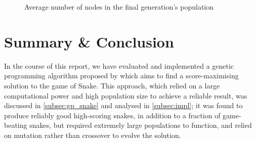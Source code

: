 \documentclass[british,10pt,a4paper]{article}
\begin{document}
\begin{figure}
  \vspace{-50pt}
  \begin{center}
	  \vspace{-5pt}
		\caption{Average number of nodes in the final generation's population}
		\label{fig:box_plot_algorithm_size}
	  \vspace{-10pt}
	  \end{center}
\end{figure}
\section{Summary \& Conclusion}
In the course of this report, we have evaluated and implemented a genetic programming algorithm proposed by \citet{Ehlis2000-sz} which aims to find a score-maximising solution to the game of Snake. This approach, which relied on a large computational power and high population size to achieve a reliable result, was discussed in \autoref{subsec:gp_snake} and analysed in \autoref{subsec:impl}; it was found to produce reliably good high-scoring snakes, in addition to a fraction of game-beating snakes, but required extremely large populations to function, and relied on mutation rather than crossover to evolve the solution. 
\end{document}
